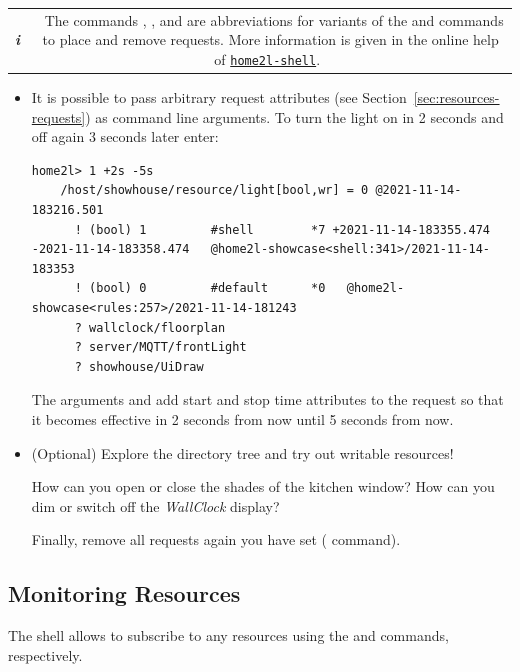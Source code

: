 \documentclass[12pt,english,parskip=half,headheight=19pt]{scrreprt}
\newcommand{\lst}[1]{\colorbox{lstbackground}{\footnotesize\code{#1}}}
\newcommand{\infobox}[1]{
  \par
  \medskip
  \hfill
  \setlength\arrayrulewidth{1pt}
  \begin{tabular}[t]{c|c|}
    \parbox{1.8em}{\hfill\textit{\Huge\textbf{i}\,}}
    &
    \,\parbox{0.89\linewidth}{\setlength{\parskip}{0.5em} \small #1}\,
  \end{tabular}
  \medskip
  \par
}
\newcommand{\idx}[1]{#1\index{#1}}
\newcommand{\reftool}[1]{\hyperref[tool:#1]{\texttt{\idx{#1}}}}
\begin{document}
\infobox{
  The commands \lst{0}, \lst{1}, and \lst{-} are abbreviations for variants of the \lst{r+} and \lst{r-}
  commands to place and remove requests. More information is given in the online help of \reftool{home2l-shell}.
}

\begin{itemize}[$\blacktriangleright$]

\item
  It is possible to pass arbitrary request attributes (see Section~\ref{sec:resources-requests})
  as command line arguments. To turn the light on in 2 seconds and off
  again 3 seconds later enter:
  \begin{lstlisting}[language=home2l]
    home2l> 1 +2s -5s
    /host/showhouse/resource/light[bool,wr] = 0 @2021-11-14-183216.501
      ! (bool) 1         #shell        *7 +2021-11-14-183355.474 -2021-11-14-183358.474   @home2l-showcase<shell:341>/2021-11-14-183353
      ! (bool) 0         #default      *0   @home2l-showcase<rules:257>/2021-11-14-181243
      ? wallclock/floorplan
      ? server/MQTT/frontLight
      ? showhouse/UiDraw
  \end{lstlisting}
  The arguments \lst{+2s} and \lst{-5s} add start and stop time attributes to
  the request so that it becomes effective in 2 seconds from now until 5 seconds
  from now.

\item
  (Optional) Explore the directory tree and try out writable resources!

  How can you open or close the shades of the kitchen window?
  How can you dim or switch off the \textit{WallClock} display?

  Finally, remove all requests again you have set (\lst{r-} command).

\end{itemize}





\subsection{Monitoring Resources}
\label{sec:tutorial-shell-monitor}


The shell allows to subscribe to any resources using the \lst{s+} and \lst{s-} commands, respectively.
\end{document}
